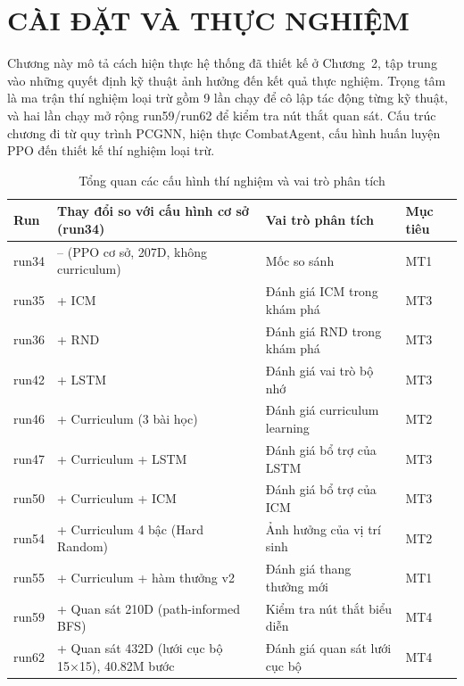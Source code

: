 \clearpage
{}

\setcounter{chapter}{2}
\chapter[CÀI ĐẶT VÀ THỰC NGHIỆM]{CÀI ĐẶT VÀ THỰC NGHIỆM}
Chương này mô tả cách hiện thực hệ thống đã thiết kế ở Chương~2, tập trung vào những quyết định kỹ thuật ảnh hưởng đến kết quả thực nghiệm. Trọng tâm là ma trận thí nghiệm loại trừ gồm 9 lần chạy để cô lập tác động từng kỹ thuật, và hai lần chạy mở rộng run59/run62 để kiểm tra nút thắt quan sát. Cấu trúc chương đi từ quy trình PCGNN, hiện thực CombatAgent, cấu hình huấn luyện PPO đến thiết kế thí nghiệm loại trừ.
\begin{table}[H]
    \centering
    \small
    \caption{Tổng quan các cấu hình thí nghiệm và vai trò phân tích}
    \label{tab:experiment_roadmap}
    \begin{tabular}{|p{1.4cm}|p{4.8cm}|p{4.5cm}|p{3.0cm}|}
        \hline
        \textbf{Run} & \textbf{Thay đổi so với cấu hình cơ sở (run34)} & \textbf{Vai trò phân tích} & \textbf{Mục tiêu} \\
        \hline
        run34 & -- (PPO cơ sở, 207D, không curriculum) & Mốc so sánh & MT1 \\
        \hline
        run35 & + ICM & Đánh giá ICM trong khám phá & MT3 \\
        \hline
        run36 & + RND & Đánh giá RND trong khám phá & MT3 \\
        \hline
        run42 & + LSTM & Đánh giá vai trò bộ nhớ & MT3 \\
        \hline
        run46 & + Curriculum (3 bài học) & Đánh giá curriculum learning & MT2 \\
        \hline
        run47 & + Curriculum + LSTM & Đánh giá bổ trợ của LSTM & MT3 \\
        \hline
        run50 & + Curriculum + ICM & Đánh giá bổ trợ của ICM & MT3 \\
        \hline
        run54 & + Curriculum 4 bậc (Hard Random) & Ảnh hưởng của vị trí sinh & MT2 \\
        \hline
        run55 & + Curriculum + hàm thưởng v2 & Đánh giá thang thưởng mới & MT1 \\
        \hline
        run59 & + Quan sát 210D (path-informed BFS) & Kiểm tra nút thắt biểu diễn & MT4 \\
        \hline
        run62 & + Quan sát 432D (lưới cục bộ 15×15), 40.82M bước & Đánh giá quan sát lưới cục bộ & MT4 \\
        \hline
    \end{tabular}
\end{table}

